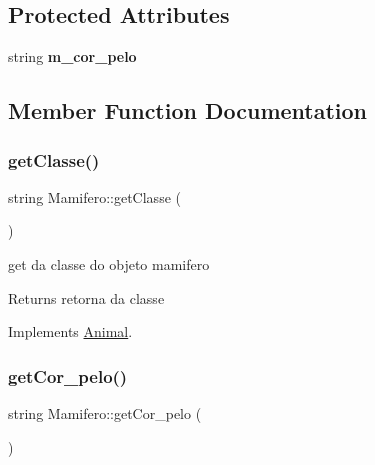 \subsection*{Protected Attributes}
\begin{DoxyCompactItemize}
\item 
\mbox{\label{class_mamifero_a4463eb72abe3756b6bbd00fb43bbc883}} 
string {\bfseries m\+\_\+cor\+\_\+pelo}
\end{DoxyCompactItemize}


\subsection{Member Function Documentation}
\mbox{\label{class_mamifero_a2cb8e1f8125258af51bf18f82d68c085}} 
\subsubsection{\texorpdfstring{getClasse()}{getClasse()}}
{\footnotesize\ttfamily string Mamifero\+::get\+Classe (\begin{DoxyParamCaption}{ }\end{DoxyParamCaption})\hspace{0.3cm}{\ttfamily [virtual]}}



get da classe do objeto mamifero 

\begin{DoxyReturn}{Returns}
retorna da classe 
\end{DoxyReturn}


Implements \mbox{\hyperlink{class_animal}{Animal}}.

\mbox{\label{class_mamifero_a8f078391ac1f3f6b4f2c5bb05a2bd268}} 
\subsubsection{\texorpdfstring{getCor\_pelo()}{getCor\_pelo()}}
{\footnotesize\ttfamily string Mamifero\+::get\+Cor\+\_\+pelo (\begin{DoxyParamCaption}{ }\end{DoxyParamCaption})}



